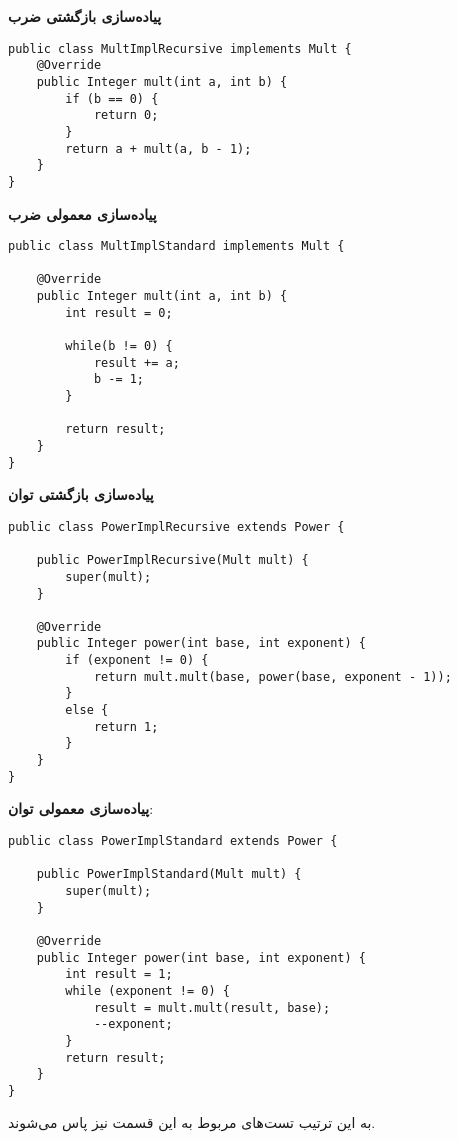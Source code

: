 \textbf{پیاده‌سازی بازگشتی ضرب}
\begin{Verbatim}[tabsize=4]
public class MultImplRecursive implements Mult {
	@Override
	public Integer mult(int a, int b) {
		if (b == 0) {
			return 0;
		}
		return a + mult(a, b - 1);
	}
}
\end{Verbatim}

\textbf{پیاده‌سازی معمولی ضرب}
\begin{Verbatim}[tabsize=4]
public class MultImplStandard implements Mult {
	
	@Override
	public Integer mult(int a, int b) {
		int result = 0;
		
		while(b != 0) {
			result += a;
			b -= 1;
		}
		
		return result;
	}
}
\end{Verbatim}


\textbf{پیاده‌سازی بازگشتی توان}
\begin{Verbatim}[tabsize=4]
public class PowerImplRecursive extends Power {

	public PowerImplRecursive(Mult mult) {
		super(mult);
	}
	
	@Override
	public Integer power(int base, int exponent) {
		if (exponent != 0) {
			return mult.mult(base, power(base, exponent - 1));
		}
		else {
			return 1;
		}
	}
}
\end{Verbatim}

\textbf{پیاده‌سازی معمولی توان}:
\begin{Verbatim}[tabsize=4]
public class PowerImplStandard extends Power {
	
	public PowerImplStandard(Mult mult) {
		super(mult);
	}
	
	@Override
	public Integer power(int base, int exponent) {
		int result = 1;
		while (exponent != 0) {
			result = mult.mult(result, base);
			--exponent;
		}
		return result;
	}
}
\end{Verbatim}

به این ترتیب تست‌های مربوط به این قسمت نیز پاس می‌شوند.